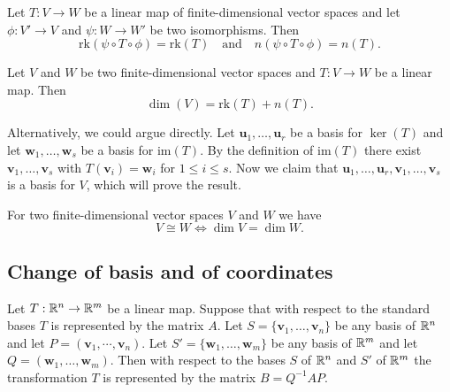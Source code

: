 \documentclass[10pt, a4paper]{article}
\newcommand{\mbf}[1]{\mathbf{#1}}
\begin{document}
\begin{proposition}
    Let $T : V \rightarrow W$ be a linear map of finite-dimensional vector spaces and let $\phi : V' \rightarrow V$ and $\psi : W \rightarrow W'$ be two isomorphisms.
    Then
    \[
    \mathrm{rk}(\psi \circ T \circ \phi) = \mathrm{rk}(T)\quad\text{and}\quad n(\psi \circ T \circ \phi) = n(T).
    \]
\end{proposition}

\begin{theorem}
    Let $V$ and $W$ be two finite-dimensional vector spaces and $T : V \rightarrow W$ be a linear map.
    Then
    \[
    \dim(V) = \mathrm{rk}(T) + n(T).
    \]
\end{theorem}

\begin{remark}
    Alternatively,
    we could argue directly.
    Let $\mbf{u}_1, \dotsc, \mbf{u}_r$ be a basis for $\ker(T)$ and let $\mbf{w}_1, \dotsc, \mbf{w}_s$ be a basis for $\mathrm{im}(T)$.
    By the definition of $\mathrm{im}(T)$ there exist $\mbf{v}_1, \dotsc, \mbf{v}_s$ with $T(\mbf{v}_i) = \mbf{w}_i$ for $1 \leq i \leq s$.
    Now we claim that $\mbf{u}_1, \dotsc, \mbf{u}_r, \mbf{v}_1, \dotsc, \mbf{v}_s$ is a basis for $V$,
    which will prove the result.
\end{remark}

\begin{theorem}
    For two finite-dimensional vector spaces $V$ and $W$ we have
    \[
    V \cong W \iff \dim{V} = \dim{W}.
    \]
\end{theorem}

\subsection{Change of basis and of coordinates}

\begin{theorem}
    Let $T : \mathbb{R} ^ n \rightarrow \mathbb{R} ^ m$ be a linear map.
    Suppose that with respect to the standard bases $T$ is represented by the matrix $A$.
    Let $S = \{\mbf{v}_1, \dotsc, \mbf{v}_n\}$ be any basis of $\mathbb{R} ^ n$ and let $P = (\mbf{v}_1, \dotsi, \mbf{v}_n)$.
    Let $S' = \{\mbf{w}_1, \dotsc, \mbf{w}_m\}$ be any basis of $\mathbb{R} ^ m$ and let $Q = (\mbf{w}_1, \dotsc, \mbf{w}_m)$.
    Then with respect to the bases $S$ of $\mathbb{R} ^ n$ and $S'$ of $\mathbb{R} ^ m$ the transformation $T$ is represented by the matrix $B = Q ^ {-1}AP$.
\end{theorem}
\end{document}

